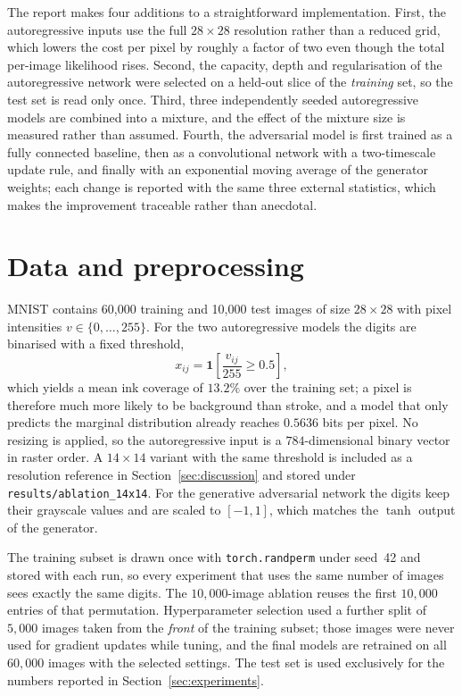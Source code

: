 \documentclass[11pt,a4paper]{article}
\begin{document}
The report makes four additions to a straightforward implementation.
First, the autoregressive inputs use the full $28\times28$ resolution rather than a reduced
grid, which lowers the cost per pixel by roughly a factor of two even though the total
per-image likelihood rises.
Second, the capacity, depth and regularisation of the autoregressive network were selected on
a held-out slice of the \emph{training} set, so the test set is read only once.
Third, three independently seeded autoregressive models are combined into a mixture, and the
effect of the mixture size is measured rather than assumed.
Fourth, the adversarial model is first trained as a fully connected baseline, then as a
convolutional network with a two-timescale update rule, and finally with an exponential moving
average of the generator weights; each change is reported with the same three external
statistics, which makes the improvement traceable rather than anecdotal.

\section{Data and preprocessing}

MNIST contains 60{,}000 training and 10{,}000 test images of size $28\times28$ with pixel
intensities $v\in\{0,\dots,255\}$.
For the two autoregressive models the digits are binarised with a fixed threshold,
\begin{equation}
  x_{ij} = \mathbf{1}\left[\frac{v_{ij}}{255} \ge 0.5\right],
  \label{eq:binarise}
\end{equation}
which yields a mean ink coverage of $13.2\%$ over the training set; a pixel is therefore much
more likely to be background than stroke, and a model that only predicts the marginal
distribution already reaches $0.5636$ bits per pixel.
No resizing is applied, so the autoregressive input is a $784$-dimensional binary vector in
raster order. A $14\times14$ variant with the same threshold is included as a resolution
reference in Section~\ref{sec:discussion} and stored under \texttt{results/ablation\_14x14}.
For the generative adversarial network the digits keep their grayscale values and are scaled
to $[-1,1]$, which matches the $\tanh$ output of the generator.

The training subset is drawn once with \texttt{torch.randperm} under seed~42 and stored with
each run, so every experiment that uses the same number of images sees exactly the same
digits. The $10{,}000$-image ablation reuses the first $10{,}000$ entries of that permutation.
Hyperparameter selection used a further split of $5{,}000$ images taken from the \emph{front}
of the training subset; those images were never used for gradient updates while tuning, and
the final models are retrained on all $60{,}000$ images with the selected settings.
The test set is used exclusively for the numbers reported in Section~\ref{sec:experiments}.
\end{document}
